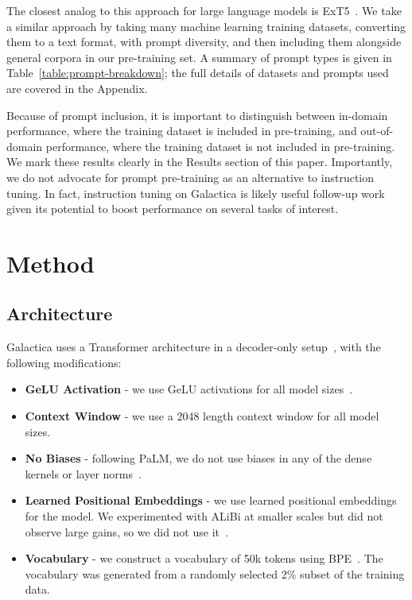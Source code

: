 The closest analog to this approach for large language models is ExT5~\citep{ExT5}. We take a similar approach by taking many machine learning training datasets, converting them to a text format, with prompt diversity, and then including them alongside general corpora in our pre-training set. A summary of prompt types is given in Table~\ref{table:prompt-breakdown}; the full details of datasets and prompts used are covered in the Appendix.

Because of prompt inclusion, it is important to distinguish between in-domain performance, where the training dataset is included in pre-training, and out-of-domain performance, where the training dataset is not included in pre-training. We mark these results clearly in the Results section of this paper. Importantly, we do not advocate for prompt pre-training as an alternative to instruction tuning. In fact, instruction tuning on Galactica is likely useful follow-up work given its potential to boost performance on several tasks of interest.

\section{Method}

\subsection{Architecture}

Galactica uses a Transformer architecture in a decoder-only setup~\citep{VaswaniSPUJGKP17}, with the following modifications:

\begin{itemize}
    \item \textbf{GeLU Activation} - we use GeLU activations for all model sizes~\citep{GeLU}.
    \item \textbf{Context Window} - we use a 2048 length context window for all model sizes.
    \item \textbf{No Biases} - following PaLM, we do not use biases in any of the dense kernels or layer norms~\citep{PaLM}.
    \item \textbf{Learned Positional Embeddings} - we use learned positional embeddings for the model. We experimented with ALiBi at smaller scales but did not observe large gains, so we did not use it~\citep{ALiBi}.
    \item \textbf{Vocabulary} - we construct a vocabulary of 50k tokens using BPE~\citep{BPE}. The vocabulary was generated from a randomly selected 2\% subset of the training data.
\end{itemize}

